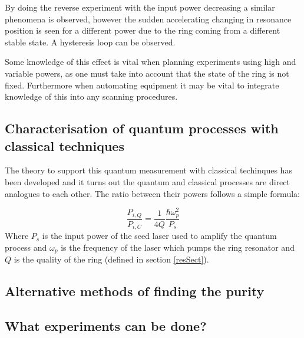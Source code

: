 By doing the reverse experiment with the input power decreasing a similar phenomena is observed, however the sudden accelerating changing in resonance position is seen for a different power due to the ring coming from a different stable state. A hysteresis loop can be observed.

Some knowledge of this effect is vital when planning experiments using high and variable powers, as one must take into account that the state of the ring is not fixed. Furthermore when automating equipment it may be vital to integrate knowledge of this into any scanning procedures. 

\subsection{Characterisation of quantum processes with classical techniques} \label{marcoStuff}
The theory to support this quantum measurement with classical techinques has been developed \cite{azzini_classical_2012} and it turns out the quantum and classical processes are direct analogues to each other. The ratio between their powers follows a simple formula:

\begin{equation}
\frac{P_{i,Q}} {P_{i,C}}=\frac{1}{4Q}\frac{\hbar\omega_p^2}{P_s}
\end{equation}
Where $P_s$ is the input power of the seed laser used to amplify the quantum process and $\omega_p$ is the frequency of the laser which pumps the ring resonator and $Q$ is the quality of the ring (defined in section \ref{resSect}).

\subsection{Alternative methods of finding the purity}


\subsection{What experiments can be done?}
